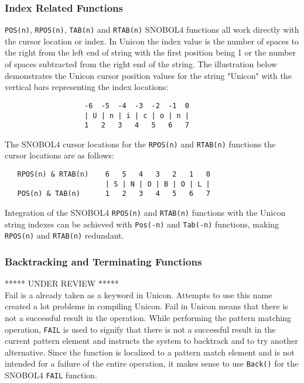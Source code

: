\documentclass{article}
\begin{document}
\vspace{1 pc}
\subsubsection{Index Related Functions}
\texttt{POS(n)}, \texttt{RPOS(n)}, \texttt{TAB(n)} and \texttt{RTAB(n)} SNOBOL4 functions all work directly with the cursor location or index.  In Unicon the index value is the number of spaces to the right from the left end of string with the first position being 1 or the number of spaces subtracted from the right end of the string.\cite{JefferyUnicon}   The illustration below demonstrates the Unicon cursor position values for the string "Unicon" with the vertical bars representing the index locations:

\begin{verbatim}
                   -6  -5  -4  -3  -2  -1  0
                   | U | n | i | c | o | n |
                   1   2   3   4   5   6   7
\end{verbatim}

The SNOBOL4 cursor locations for the \texttt{RPOS(n)} and \texttt{RTAB(n)} functions the cursor locations are as follows:

\begin{verbatim}
   RPOS(n) & RTAB(n)    6   5   4   3   2   1   0
                        | S | N | O | B | O | L |
   POS(n) & TAB(n)      1   2   3   4   5   6   7
\end{verbatim}

Integration of the SNOBOL4 \texttt{RPOS(n)} and \texttt{RTAB(n)} functions with the Unicon string indexes can be achieved with \texttt{Pos(-n)} and \texttt{Tab(-n)} functions, making \texttt{RPOS(n)} and \texttt{RTAB(n)} redundant.

\vspace{1 pc}
\subsubsection{Backtracking and Terminating Functions}
***** UNDER REVIEW *****\\
Fail is a already taken as a keyword in Unicon.  Attempts to use this name created a lot problems in compiling Unicon.  Fail in Unicon means that there is not a successful result in the operation.  While performing the pattern matching operation, \texttt{FAIL} is used to signify that there is not a successful result in the current pattern element and instructs the system to backtrack and to try another alternative.  Since the function is localized to a pattern match element and is not intended for a failure of the entire operation, it makes sense to use \texttt{Back()} for the SNOBOL4 \texttt{FAIL} function.
\end{document}

